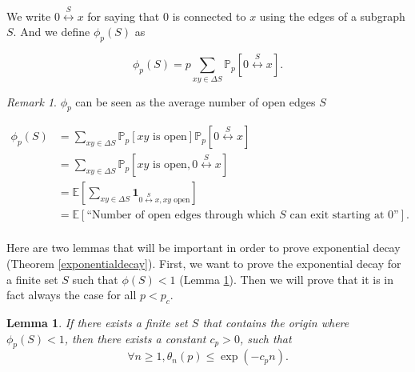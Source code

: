 \documentclass[a4paper,11pt]{article}
\theoremstyle{plain}
\newtheorem{lemma}[theorem]{Lemma}
\theoremstyle{definition}
\theoremstyle{remark}
\newtheorem*{remark}{Remark}
\begin{document}
We write $0 \stackrel{S}{\longleftrightarrow} x$ for saying that $0$ is connected to $x$ using the edges of a subgraph $S$.
And we define $\phi_p(S)$ as

\[ \phi_p(S) = p\sum_{xy \in \Delta S} \mathbb{P}_p[0 \stackrel{S}{\longleftrightarrow} x]. \]

\begin{remark}
$\phi_p$ can be seen as the average number of open edges $S$

\begin{align*}
    \phi_p(S) &= \sum_{xy \in \Delta S}{\mathbb{P}_p[xy \text{ is open}]\mathbb{P}_p[0 \stackrel{S}{\longleftrightarrow} x]} \\
    &= \sum_{xy \in \Delta S}{\mathbb{P}_p[xy \text{ is open}, 0 \stackrel{S}{\longleftrightarrow} x]} \\
    &= \mathbb{E}\left[\sum_{xy \in \Delta S}{\mathbf{1}_{0 \stackrel{S}{\longleftrightarrow} x, xy \text{ open}}}\right] \\
    &= \mathbb{E}[\text{``Number of open edges through which } S \text{ can exit starting at 0''}]. \\
\end{align*}
\end{remark}

Here are two lemmas that will be important in order to prove exponential decay (Theorem \ref{exponentialdecay}). First, we want to prove the exponential decay for a finite set $S$ such that $\phi(S) < 1$ (Lemma \ref{firstlemma_expdecay}). Then we will prove that it is in fact always the case for all $p < p_c$.
\begin{lemma}
\label{firstlemma_expdecay}
If there exists a finite set $S$ that contains the origin where $\phi_p(S) < 1$, then there exists a constant $c_p > 0$, such that
\[ \forall n \geq 1, \theta_n(p) \leq \exp(-c_p n). \]
\end{lemma}
\end{document}
